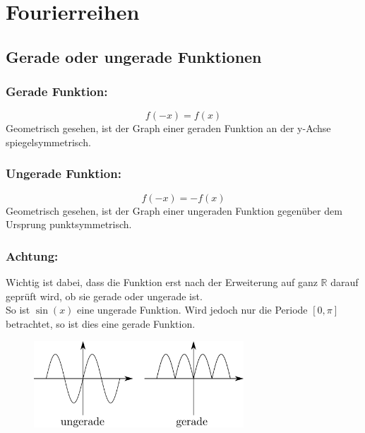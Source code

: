 



\section{Fourierreihen}

\subsection{Gerade oder ungerade Funktionen}

\subsubsection{Gerade Funktion: }
\[ \boxed{f(-x) = f(x)} \]
Geometrisch gesehen, ist der Graph einer geraden Funktion an der y-Achse 
spiegelsymmetrisch.
\subsubsection{Ungerade Funktion: }
\[ \boxed{f(-x) = -f(x)} \]
Geometrisch gesehen, ist der Graph einer ungeraden Funktion gegenüber dem 
Ursprung punktsymmetrisch.
\subsubsection{Achtung: }
Wichtig ist dabei, dass die Funktion erst nach der Erweiterung auf ganz 
$\mathbb{R}$ darauf geprüft wird, ob sie gerade oder ungerade ist. \\
So ist $\sin(x)$ eine ungerade Funktion. Wird jedoch nur die Periode 
$[0, \pi]$ betrachtet, so ist dies eine gerade Funktion.

\begin{figure}[h!]
\centering
\includegraphics[width=0.7\textwidth]{../fig/geradeungerade.pdf}
\end{figure}


